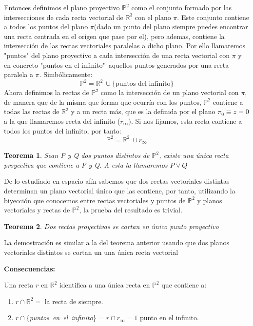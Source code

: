 \documentclass[11pt, a4paper]{article}
\makeatletter
\newif\IfInSansMode
\let\oldsf\sffamily
\renewcommand*{\sffamily}{\oldsf\mathversion{sans}\InSansModetrue}
\let\oldnorm\normalfont
\renewcommand*{\normalfont}{\oldnorm\InSansModefalse\mathversion{normal}}
\renewenvironment{proof}[1][\proofname] {\vspace{-15pt}\par\pushQED{\qed}\normalfont\topsep6\p@\@plus6\p@\relax\trivlist\item[\hskip\labelsep\it#1\@addpunct{.}]\ignorespaces}{\popQED\endtrivlist\@endpefalse}
\renewenvironment{proof}[1][\proofname] {\par\pushQED{\qed}\normalfont\topsep6\p@\@plus6\p@\relax\trivlist\item[\hskip\labelsep\itshape\sffamily#1\@addpunct{.}]\ignorespaces}{\popQED\endtrivlist\@endpefalse}
\theoremstyle{theorem-style}
\newtheorem{nth}{Teorema}[section]
\theoremstyle{definition-style}
\theoremstyle{remark-style}
\theoremstyle{example-style}
\newenvironment{nlist}
{\begin{enumerate}
    \renewcommand\labelenumi{(\emph{\roman{enumi})}}}
  {\end{enumerate}}
\makeatother
\begin{document}
Entonces definimos el plano proyectivo $\mathbb{P}^2$ como el conjunto formado por las intersecciones de cada recta vectorial de $\mathbb{R}^3$ con el plano $\pi$. Este conjunto contiene a todos los puntos del plano $\pi$(dado un punto del plano siempre puedes encontrar una recta centrada en el origen que pase por el), pero ademas, contiene la intersección de las rectas vectoriales paralelas a dicho plano. Por ello llamaremos "puntos" del plano proyectivo a cada intersección de una recta vectorial con $\pi$ y en concreto "puntos en el infinito"\ aquellos puntos generados por una recta paralela a $\pi$. Simbólicamente:
$$\mathbb{P}^2 = \mathbb{R}^2\ \cup \{\text{puntos del infinito}\}$$
Ahora definimos la rectas de $\mathbb{P}^2$ como la intersección de un plano vectorial con $\pi$, de manera que de la misma que forma que ocurría con los puntos, $\mathbb{P}^2$ contiene a todas las rectas de $\mathbb{R}^2$ y a un recta más, que es la definida por el plano $\pi_0 \equiv z= 0$ a la que llamaremos recta del infinito ($r_\infty$). Si nos fijamos, esta recta contiene a todos los puntos del infinito, por tanto:
$$\mathbb{P}^2 = \mathbb{R}^2\ \cup r_\infty$$

\begin{nth}
Sean P y Q dos puntos distintos de $\mathbb{P}^2$, existe una única recta proyectiva que contiene a P y Q. A esta la llamaremos $P \vee Q$
\end{nth}
\begin{proof}

De lo estudiado en espacio afín sabemos que dos rectas vectoriales distintas determinan un plano vectorial único que las contiene, por tanto, utilizando la biyección que conocemos entre rectas vectoriales y puntos de $\mathbb{P}^2$ y planos vectoriales y rectas de $\mathbb{P}^2$, la prueba del resultado es trivial.
\end{proof}

\begin{nth}
Dos rectas proyectivas se cortan en único  punto proyectivo
\end{nth}
\begin{proof}
La demostración es similar a la del teorema anterior usando que dos planos vectoriales distintos se cortan un una única recta vectorial
\end{proof}

\textbf{Consecuencias:}

Una recta $r$ en $\mathbb{R}^2$ identifica a una única recta en $\mathbb{P}^2$ que contiene a:
\begin{nlist}

	\item $r \cap \mathbb{R}^2 =$ la recta de siempre. 
	\item $r \cap \{$\textit{puntos\ en\ el\ infinito}\} = $r \cap r_\infty = 1$ punto en el infinito.

\end{nlist}
\end{document}
